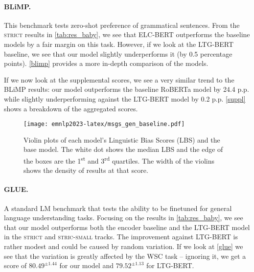 \paragraph{BLiMP.}
This benchmark tests zero-shot preference of grammatical sentences. From the \textsc{strict} results in \cref{tab:res_baby}, we see that ELC-BERT outperforms the baseline models by a fair margin on this task. %
However, if we look at the LTG-BERT baseline, we see that our model slightly underperforms it (by 0.5 percentage points). \cref{blimp} provides a more in-depth comparison of the models.%

If we now look at the supplemental scores, we see a very similar trend to the BLiMP results: our model outperforms the baseline RoBERTa model by 24.4 p.p. while slightly underperforming against the LTG-BERT model by 0.2 p.p. \cref{suppl} shows a breakdown of the aggregated scores. %

\begin{figure}
    \centering
    \texttt{[image: emnlp2023-latex/msgs\_gen\_baseline.pdf]}
    \caption{Violin plots of each model's Linguistic Bias Scores (LBS) and the base model. The white dot shows the median LBS and the edge of the boxes are the 1\textsuperscript{st} and 3\textsuperscript{rd} quartiles. The width of the violins shows the density of results at that score.}
    \label{fig:msgs_gen_baseline}
\end{figure}

\paragraph{GLUE.} 

A standard LM benchmark that tests the ability to be finetuned for general language understanding tasks. Focusing on the results in \cref{tab:res_baby}, we see that our model outperforms both the encoder baseline %
and the LTG-BERT model %
in the \textsc{strict} and \textsc{stric-small} tracks. The improvement against LTG-BERT is rather modest and could be caused by random variation. If we look at \cref{glue} we see that the variation is greatly affected by the WSC task -- %
ignoring it, we get a score of $80.49^{\pm{1.44}}$ for our model and $79.52^{\pm{1.13}}$ for LTG-BERT. %

